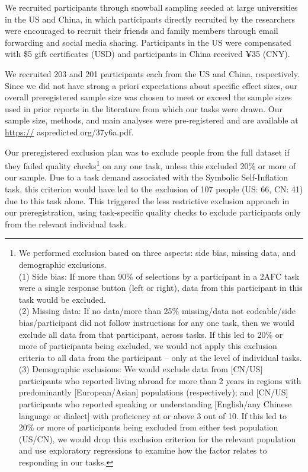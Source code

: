 \documentclass[
  man,floatsintext]{apa6}
\begin{document}
We recruited participants through snowball sampling seeded at large universities in the US and China, in which participants directly recruited by the researchers were encouraged to recruit their friends and family members through email forwarding and social media sharing. Participants in the US were compensated with \$5 gift certificates (USD) and participants in China received ¥35 (CNY).

We recruited 203 and 201 participants each from the US and China, respectively. Since we did not have strong a priori expectations about specific effect sizes, our overall preregistered sample size was chosen to meet or exceed the sample sizes used in prior reports in the literature from which our tasks were drawn. Our sample size, methods, and main analyses were pre-registered and are available at \url{https://} aspredicted.org/37y6a.pdf.

Our preregistered exclusion plan was to exclude people from the full dataset if they failed quality checks\footnote{
  We performed exclusion based on three aspects: side bias, missing data, and demographic exclusions.\\
  (1) Side bias: If more than 90\% of selections by a participant in a 2AFC task were a single response button (left or right), data from this participant in this task would be excluded.\\
  (2) Missing data: If no data/more than 25\% missing/data not codeable/side bias/participant did not follow instructions for any one task, then we would exclude all data from that participant, across tasks. If this led to 20\% or more of participants being excluded, we would not apply this exclusion criteria to all data from the participant -- only at the level of individual tasks.\\
  (3) Demographic exclusions: We would exclude data from {[}CN/US{]} participants who reported living abroad for more than 2 years in regions with predominantly {[}European/Asian{]} populations (respectively); and {[}CN/US{]} participants who reported speaking or understanding {[}English/any Chinese language or dialect{]} with proficiency at or above 3 out of 10. If this led to 20\% or more of participants being excluded from either test population (US/CN), we would drop this exclusion criterion for the relevant population and use exploratory regressions to examine how the factor relates to responding in our tasks.} on any one task, unless this excluded 20\% or more of our sample. Due to a task demand associated with the Symbolic Self-Inflation task, this criterion would have led to the exclusion of 107 people (US: 66, CN: 41) due to this task alone. This triggered the less restrictive exclusion approach in our preregistration, using task-specific quality checks to exclude participants only from the relevant individual task.
\end{document}
